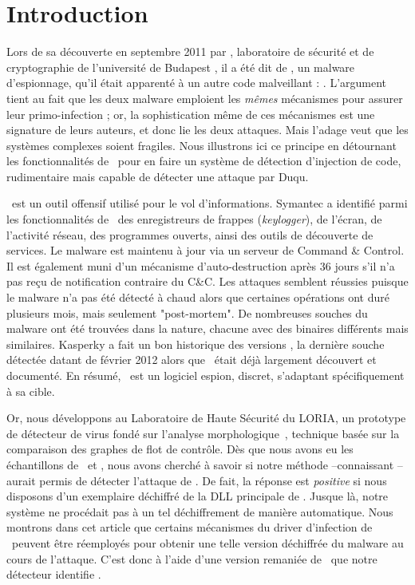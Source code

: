 
\section{Introduction}

Lors de sa découverte en septembre 2011 par \Crysys, laboratoire de sécurité et de cryptographie de l'université de Budapest \cite{AThierry_CrysysDuquStuxnet}, il a été dit de \Duqu, un malware d'espionnage, qu'il était apparenté à un autre code malveillant : \Stuxnet. L'argument tient au fait que les deux malware emploient les \emph{mêmes} mécanismes pour assurer leur primo-infection ; or, la sophistication même de ces mécanismes est une signature de leurs auteurs, et donc lie les deux attaques. Mais l'adage veut que les systèmes complexes soient fragiles. Nous  illustrons ici ce principe en détournant les fonctionnalités de \Duqu\ pour en faire un système de détection d'injection de code, rudimentaire mais capable de détecter une attaque par Duqu.


\Duqu\ est un outil offensif utilisé pour le vol d'informations. Symantec \cite{AThierry_SymantecDuqu2011} a identifié parmi les fonctionnalités de \Duqu\ des enregistreurs de frappes (\emph{keylogger}), de l'écran, de l'activité réseau, des programmes ouverts, ainsi des outils de découverte de services. Le malware est maintenu à jour via un serveur de Command \& Control. Il est également muni d'un mécanisme d'auto-destruction après 36 jours s'il n'a pas reçu de notification contraire du C\&C. 
Les attaques semblent réussies puisque le malware n'a pas été détecté à chaud alors que certaines opérations ont duré plusieurs mois, mais seulement "post-mortem".
De nombreuses souches du malware ont été trouvées dans la nature, chacune avec des binaires différents mais similaires. Kasperky a fait un bon historique des versions \cite{AThierry_KaspDuqu10}, la dernière souche détectée datant de février 2012 alors que \Duqu\ était déjà largement découvert et documenté.
En résumé, \Duqu\ est un logiciel espion, discret, s'adaptant spécifiquement à sa cible. 

Or, nous développons au Laboratoire de Haute Sécurité du LORIA, un prototype de détecteur de virus fondé sur l'analyse morphologique~\cite{AThierry_BKM08}, technique basée sur la comparaison des graphes de flot de contrôle.  Dès que nous avons eu les échantillons de \Stuxnet\ et \Duqu, nous avons cherché à savoir si notre méthode --connaissant \Stuxnet-- aurait permis de détecter l'attaque de \Duqu. De fait, la réponse est \emph{positive} si nous disposons d'un exemplaire déchiffré de la DLL principale de \Duqu. Jusque là, notre système ne procédait pas à un tel déchiffrement de manière automatique. Nous montrons dans cet article que certains mécanismes du driver d'infection de \Duqu\ peuvent être réemployés pour obtenir une telle version déchiffrée du malware au cours de l'attaque. C'est donc à l'aide d'une version remaniée de \Duqu\ que notre détecteur identifie \Duqu.

